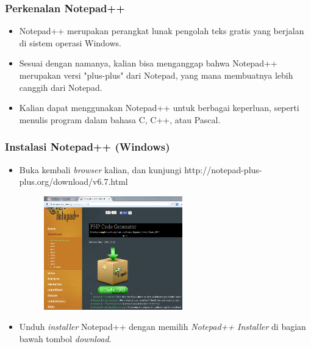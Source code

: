 \begin{frame}
\frametitle{Perkenalan Notepad++}
\begin{itemize}
  \item Notepad++ merupakan perangkat lunak pengolah teks gratis yang berjalan di sistem operasi Windows.
  \item Sesuai dengan namanya, kalian bisa menganggap bahwa Notepad++ merupakan versi "plus-plus" dari Notepad, yang mana membuatnya lebih canggih dari Notepad.
  \item Kalian dapat menggunakan Notepad++ untuk berbagai keperluan, seperti menulis program dalam bahasa C, C++, atau Pascal.
\end{itemize}
\end{frame}

\begin{frame}
\frametitle{Instalasi Notepad++ (Windows)}
\begin{itemize}
  \item Buka kembali \textit{browser} kalian, dan kunjungi http://notepad-plus-plus.org/download/v6.7.html
  \begin{figure}
    \includegraphics[width=6cm]{asset/npp_1.PNG}
  \end{figure}
  \item Unduh \textit{installer} Notepad++ dengan memilih \textit{Notepad++ Installer} di bagian bawah tombol \textit{download}.
\end{itemize}
\end{frame}

